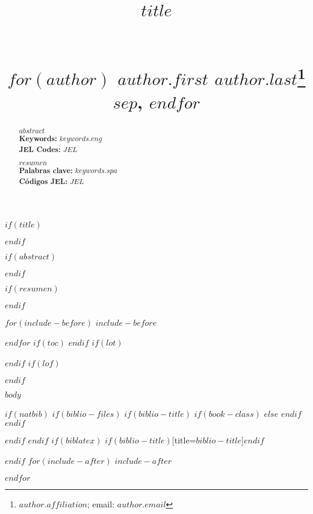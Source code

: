 \documentclass[fontsize=10pt,lang=eng]{article}
\title{
\noindent
{\sffamily \Large\textbf{$title$}} \\
\selectlanguage{spanish}{\sffamily \normalsize \textbf{$trans-title$}} \\
\selectlanguage{english}
\hfill \\
\hfill \normalsize {\sffamily
  $for(author)$
  $author.first$ $author.last$\footnote{$author.affiliation$; email: $author.email$}
  $sep$, $endfor$} \\
}
\date{\vspace{-5ex}}
\begin{document}

$if(title)$
\maketitle
$endif$

$if(abstract)$
\begin{abstract}
$abstract$\\
\textbf{Keywords:} $keywords.eng$ \\
\textbf{JEL Codes:} $JEL$
\end{abstract}
$endif$

$if(resumen)$
\begin{abstract}
$resumen$\\
\textbf{Palabras clave:} $keywords.spa$ \\
\textbf{Códigos JEL:} $JEL$
\end{abstract}
$endif$

$for(include-before)$
$include-before$

$endfor$
$if(toc)$
{
\hypersetup{linkcolor=black}
\setcounter{tocdepth}{$toc-depth$}
\tableofcontents
}
$endif$
$if(lot)$
\listoftables
$endif$
$if(lof)$
\listoffigures
$endif$


$body$


$if(natbib)$
$if(biblio-files)$
$if(biblio-title)$
$if(book-class)$
\renewcommand\bibname{$biblio-title$}
$else$
\renewcommand\refname{$biblio-title$}
$endif$
$endif$


$endif$
$endif$
$if(biblatex)$
\printbibliography$if(biblio-title)$[title=$biblio-title$]$endif$

$endif$
$for(include-after)$
$include-after$

$endfor$
\end{document}
